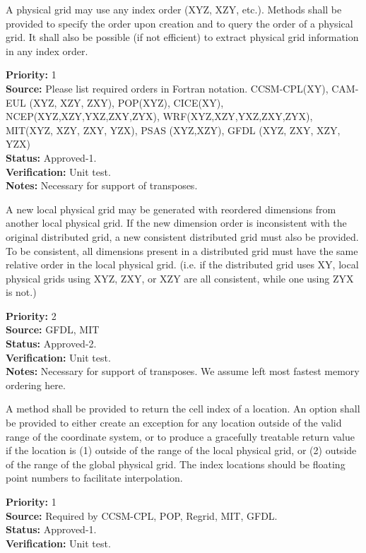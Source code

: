 A physical grid may use any index order (XYZ, XZY, etc.).  Methods shall be provided to
specify the order upon creation and to query the order of a physical grid.  It shall
also be possible (if not efficient) to extract physical grid information in any index
order.
\begin{reqlist}
{\bf Priority:}  1 \\
{\bf Source:} Please list required orders in Fortran notation. CCSM-CPL(XY), 
CAM-EUL (XYZ, XZY, ZXY), POP(XYZ), CICE(XY), NCEP(XYZ,XZY,YXZ,ZXY,ZYX), 
WRF(XYZ,XZY,YXZ,ZXY,ZYX),
MIT(XYZ, XZY, ZXY, YZX),
PSAS (XYZ,XZY), GFDL (XYZ, ZXY, XZY, YZX) \\
{\bf Status:} Approved-1. \\
{\bf Verification:} Unit test.\\
{\bf Notes:} Necessary for support of transposes.
\end{reqlist}

A new local physical grid may be generated with reordered dimensions from another local physical grid.
If the new dimension order is inconsistent with the original distributed grid, a new
consistent distributed grid must also be provided.  To be consistent, all dimensions present
in a distributed grid must have the same relative order in the local physical grid.  (i.e. if the
distributed grid uses XY, local physical grids using XYZ, ZXY, or XZY are all consistent, while one using
ZYX is not.)
\begin{reqlist}
{\bf Priority:} 2\\
{\bf Source:} GFDL, MIT\\
{\bf Status:} Approved-2. \\
{\bf Verification:} Unit test.\\
{\bf Notes:} Necessary for support of transposes. We assume left most fastest memory ordering here.
\end{reqlist}

A method shall be provided to return the cell index of a location.  An option shall
be provided to either create an exception for any location outside of the valid
range of the coordinate system, or to produce a gracefully treatable return value if
the location is (1) outside of the range of the local physical grid, or (2) outside of the
range of the global physical grid.  The index locations should be floating point numbers to
facilitate interpolation.
\begin{reqlist}
{\bf Priority:} 1\\
{\bf Source:} Required by CCSM-CPL, POP, Regrid, MIT, GFDL. \\
{\bf Status:} Approved-1. \\
{\bf Verification:} Unit test.
\end{reqlist}

